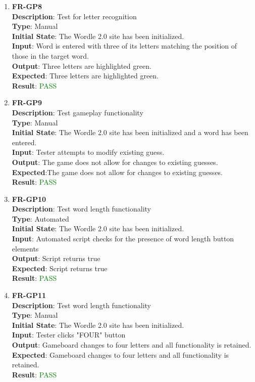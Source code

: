 \documentclass[12pt, titlepage]{article}
\begin{document}
\begin{enumerate}
	\item \textbf{FR-GP8\\}
	\textbf{Description}: Test for letter recognition \\
	\textbf{Type}: Manual\\
	\textbf{Initial State}: The Wordle 2.0 site has been initialized.\\
	\textbf{Input}: Word is entered with three of its letters matching the position of those in the target word.\\
	\textbf{Output}: Three letters are highlighted green. \\
	\textbf{Expected}: Three letters are highlighted green.\\
	\textbf{Result}: \textcolor{green}{PASS}\\
	
	\item \textbf{FR-GP9\\}
	\textbf{Description}: Test gameplay functionality\\
	\textbf{Type}: Manual\\
	\textbf{Initial State}: The Wordle 2.0 site has been initialized and a word has been entered.\\
	\textbf{Input}: Tester attempts to modify existing guess.\\
	\textbf{Output}: The game does not allow for changes to existing guesses. \\
	\textbf{Expected}:The game does not allow for changes to existing guesses.\\
	\textbf{Result}: \textcolor{green}{PASS}\\
	
	\item \textbf{FR-GP10\\}
	\textbf{Description}: Test word length functionality\\
	\textbf{Type}: Automated\\
	\textbf{Initial State}: The Wordle 2.0 site has been initialized.\\
	\textbf{Input}: Automated script checks for the presence of word length button elements\\
	\textbf{Output}: Script returns true \\
	\textbf{Expected}: Script returns true\\
	\textbf{Result}: \textcolor{green}{PASS}\\
	
	\item \textbf{FR-GP11\\}
	\textbf{Description}: Test word length functionality\\
	\textbf{Type}: Manual\\
	\textbf{Initial State}: The Wordle 2.0 site has been initialized.\\
	\textbf{Input}: Tester clicks "FOUR" button\\
	\textbf{Output}: Gameboard changes to four letters and all functionality is retained. \\
	\textbf{Expected}: Gameboard changes to four letters and all functionality is retained.\\
	\textbf{Result}: \textcolor{green}{PASS}\\
	

\end{enumerate}
\end{document}

